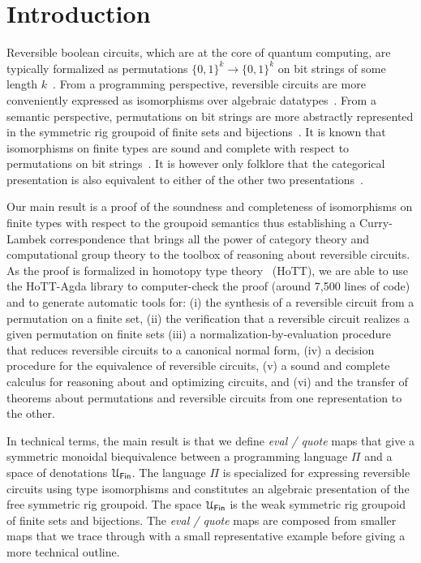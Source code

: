 \section{Introduction}
\label{sec:introduction}

Reversible boolean circuits, which are at the core of quantum computing, are
typically formalized as permutations $\{0,1\}^k \to \{0,1\}^k$ on bit strings of
some length $k$~\cite{aaronson_et_al:LIPIcs:2017:8173,1201583}. From a
programming perspective, reversible circuits are more conveniently expressed as
isomorphisms over algebraic
datatypes~\cite{James:2012:IE:2103656.2103667,theseus}. From a semantic
perspective, permutations on bit strings are more abstractly represented in the
symmetric rig groupoid of finite sets and
bijections~\cite{laplaza72,kelly74,baez2000finite}. It is known that
isomorphisms on finite types are sound and complete with respect to permutations
on bit strings~\cite{fiore-remarks}. It is however only folklore that the
categorical presentation is also equivalent to either of the other two
presentations~\cite{baez2000finite,math/9802029}.

Our main result is a proof of the soundness and completeness of isomorphisms on
finite types with respect to the groupoid semantics thus establishing a
Curry-Lambek correspondence that brings all the power of category theory and
computational group theory to the toolbox of reasoning about reversible
circuits. As the proof is formalized in homotopy type
theory~\cite{univalentfoundationsprogramHomotopyTypeTheory2013} (HoTT), we are
able to use the HoTT-Agda library to computer-check the proof (around 7,500
lines of code) and to generate automatic tools for: (i) the synthesis of a
reversible circuit from a permutation on a finite set, (ii) the verification
that a reversible circuit realizes a given permutation on finite sets (iii) a
normalization-by-evaluation procedure that reduces reversible circuits to a
canonical normal form, (iv) a decision procedure for the equivalence of
reversible circuits, (v) a sound and complete calculus for reasoning about and
optimizing circuits, and (vi) and the transfer of theorems about permutations
and reversible circuits from one representation to the other.

In technical terms, the main result is that we define \emph{eval / quote} maps
that give a symmetric monoidal biequivalence between a programming language
$\Pi$ and a space of denotations $\UFin$. The language $\Pi$ is specialized for
expressing reversible circuits using type isomorphisms and constitutes an
algebraic presentation of the free symmetric rig groupoid. The space $\UFin$ is
the weak symmetric rig groupoid of finite sets and bijections. The \emph{eval /
  quote} maps are composed from smaller maps that we trace through with a small
representative example before giving a more technical outline.

